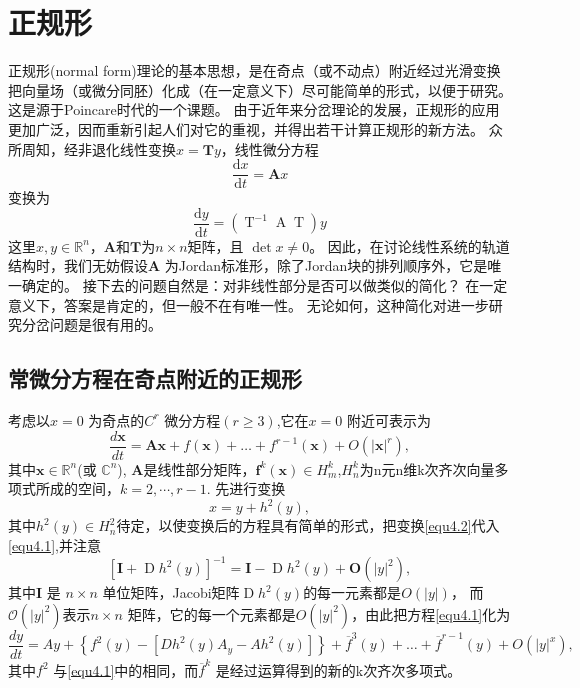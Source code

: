 \section{正规形}
正规形(normal form)理论的基本思想，是在奇点（或不动点）附近经过光滑变换把向量场（或微分同胚）化成（在一定意义下）尽可能简单的形式，以便于研究。
这是源于Poincare时代的一个课题。
由于近年来分岔理论的发展，正规形的应用更加广泛，因而重新引起人们对它的重视，并得出若干计算正规形的新方法。
众所周知，经非退化线性变换$x = \boldsymbol { T } y$，线性微分方程
\[
\frac { \mathrm { d } x } { \mathrm { d } t } = \boldsymbol { A } x
\]
变换为
\[
  \frac { \mathrm { d } y } { \mathrm { d } t } =
  \left( \operatorname{T} ^ { - 1 } \operatorname{A}  \operatorname{T}  \right) y
\]
这里$x , y \in \mathbb { R } ^ { n }$，$\mathbf{A}$和$\mathbf{T}$为$n \times n$矩阵，且
$\operatorname { det } x \neq 0$。
因此，在讨论线性系统的轨道结构时，我们无妨假设\(\mathbf{A}\)
为Jordan标准形，除了Jordan块的排列顺序外，它是唯一确定的。
接下去的问题自然是：对非线性部分是否可以做类似的简化？
在一定意义下，答案是肯定的，但一般不在有唯一性。
无论如何，这种简化对进一步研究分岔问题是很有用的。
\subsection{常微分方程在奇点附近的正规形}
考虑以\(x=0\) 为奇点的\(C^r\) 微分方程$( r \geqslant 3 )$,它在\(x=0\) 附近可表示为
\begin{equation}
\frac { d \boldsymbol{x} } { d t } = \mathbf{A} \boldsymbol{x} + f ( \boldsymbol{x}) + \dots + f ^ { r - 1 } ( \boldsymbol{x} ) + O \left( | \boldsymbol{x}| ^ { r } \right),
\label{eq:1.4.1}
\end{equation}
其中$\boldsymbol{x} \in \mathbb { R } ^ { n }$(或 \(\mathbb{C}^n\)),
\(\mathbf{A}\)是线性部分矩阵，$\boldsymbol{f}^ { k } ( \boldsymbol{x} ) \in H _ { m } ^ { k } $,$ H _ { n } ^ { k }$为n元n维k次齐次向量多项式所成的空间，$k = 2 , \cdots  , r-1$.
先进行变换
\begin{equation}
x = y + h ^ { 2 } ( y ),
  \label{eq:1.4.2}
\end{equation}
其中$h ^ { 2 } ( y ) \in H _ { n } ^ { 2 }$待定，以使变换后的方程具有简单的形式，把变换\ref{equ4.2}代入\ref{equ4.1},并注意
\[
\left[\boldsymbol  I + \operatorname D h ^ { 2 } ( y ) \right] ^ { - 1 } =  \boldsymbol I -\operatorname D h ^ { 2 } ( y ) +\boldsymbol O\left( | y | ^ { 2 } \right),
\]
其中\(\boldsymbol I\) 是 \(n \times n\) 单位矩阵，Jacobi矩阵$\operatorname D h ^ { 2 } ( y )$的每一元素都是$O ( | y | )$，
而$\mathscr O \left( | y | ^ { 2 } \right)$表示\(n \times n\) 矩阵，它的每一个元素都是$O \left( | y | ^ { 2 } \right)$，由此把方程\ref{equ4.1}化为
\begin{equation}
  \frac { d y } { d t } =
  A y + \left\{ f ^ { 2 } ( y ) -
    \left[ D h ^ { 2 } ( y ) A _ { y } - A h ^ { 2 } ( y ) \right] \right\}
  + \overline { f } ^ { 3 } ( y ) +\dots + \overline { f } ^ { r - 1 } ( y ) + O \left( | y | ^ { x } \right),
  \label{eq:1.4.3}
\end{equation}
其中\(f^2\) 与\ref{equ4.1}中的相同，而\(\overline{f}^k\) 是经过运算得到的新的k次齐次多项式。

